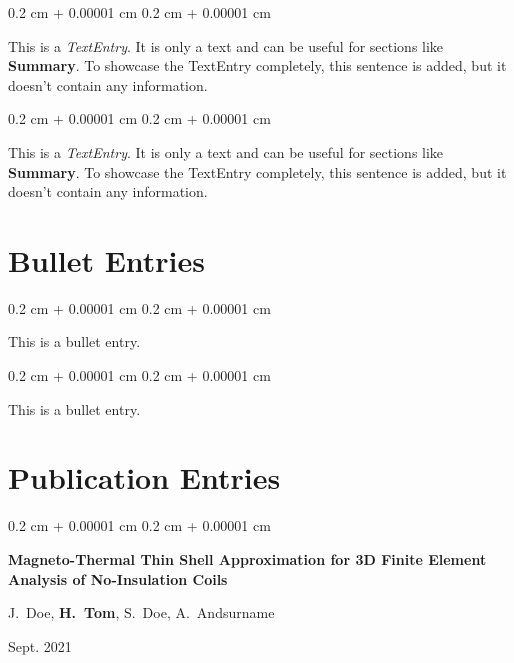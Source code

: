 \documentclass[10pt, letterpaper]{article}
\newenvironment{onecolentry}{
    \begin{adjustwidth}{
        0.2 cm + 0.00001 cm
    }{
        0.2 cm + 0.00001 cm
    }
}{
    \end{adjustwidth}
} %
\newenvironment{twocolentry}[2][]{
    \onecolentry
    \def\secondColumn{#2}
    \setcolumnwidth{\fill, 4.5 cm}
    \begin{paracol}{2}
}{
    \switchcolumn \raggedleft \secondColumn
    \end{paracol}
    \endonecolentry
} %
\begin{document}
        \vspace{0.2 cm}

        \begin{onecolentry}
            This is a \textit{TextEntry}. It is only a text and can be useful for sections like \textbf{Summary}. To showcase the TextEntry completely, this sentence is added, but it doesn't contain any information.
        \end{onecolentry}

        \vspace{0.2 cm}

        \begin{onecolentry}
            This is a \textit{TextEntry}. It is only a text and can be useful for sections like \textbf{Summary}. To showcase the TextEntry completely, this sentence is added, but it doesn't contain any information.
        \end{onecolentry}


    
    \section{Bullet Entries}

        
        \begin{onecolentry}
            \textbullet \hspace{3pt} This is a bullet entry.
        \end{onecolentry}

        \vspace{0.2 cm}

        \begin{onecolentry}
            \textbullet \hspace{3pt} This is a bullet entry.
        \end{onecolentry}


    
    \section{Publication Entries}

        
        \begin{twocolentry}{
            Sept. 2021
        }
            \begin{minipage}{\linewidth}
                \textbf{Magneto-Thermal Thin Shell Approximation for 3D Finite Element Analysis of No-Insulation Coils}

                \vspace{0.10 cm}

                \mbox{J. Doe}, \mbox{\textbf{H. Tom}}, \mbox{S. Doe}, \mbox{A. Andsurname}
            \end{minipage}
        \end{twocolentry}
\end{document}
